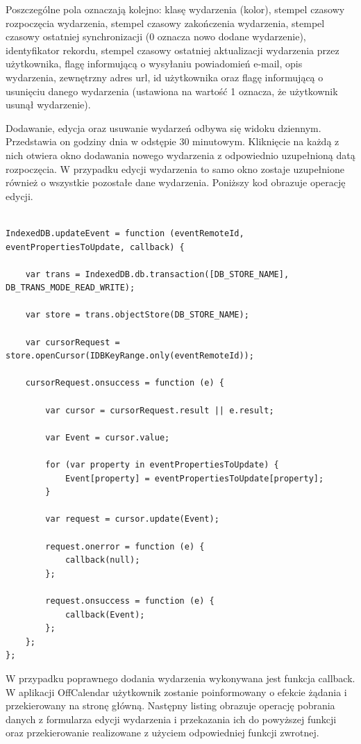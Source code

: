Poszczególne pola oznaczają kolejno: klasę wydarzenia (kolor), stempel czasowy rozpoczęcia wydarzenia, stempel czasowy zakończenia wydarzenia, stempel czasowy ostatniej synchronizacji (0 oznacza nowo dodane wydarzenie), identyfikator rekordu, stempel czasowy ostatniej aktualizacji wydarzenia przez użytkownika, flagę informującą o wysyłaniu powiadomień \mbox{e-mail}, opis wydarzenia, zewnętrzny adres url, id użytkownika oraz flagę informującą o usunięciu danego wydarzenia (ustawiona na wartość 1 oznacza, że użytkownik usunął wydarzenie).

Dodawanie, edycja oraz usuwanie wydarzeń odbywa się widoku dziennym. Przedstawia on godziny dnia w odstępie 30 minutowym. Kliknięcie na każdą z nich otwiera okno dodawania nowego wydarzenia z odpowiednio uzupełnioną datą rozpoczęcia. W przypadku edycji wydarzenia to samo okno zostaje uzupełnione również o wszystkie pozostałe dane wydarzenia. Poniższy kod obrazuje operację edycji.

\begin{lstlisting}[caption=Edycja wydarzenia cz. 1., label=amb, captionpos=b]

IndexedDB.updateEvent = function (eventRemoteId, eventPropertiesToUpdate, callback) {

    var trans = IndexedDB.db.transaction([DB_STORE_NAME], DB_TRANS_MODE_READ_WRITE);

    var store = trans.objectStore(DB_STORE_NAME);

    var cursorRequest = store.openCursor(IDBKeyRange.only(eventRemoteId));

    cursorRequest.onsuccess = function (e) {

        var cursor = cursorRequest.result || e.result;

        var Event = cursor.value;

        for (var property in eventPropertiesToUpdate) {
            Event[property] = eventPropertiesToUpdate[property];
        }

        var request = cursor.update(Event);

        request.onerror = function (e) {
            callback(null);
        };

        request.onsuccess = function (e) {
            callback(Event);
        };
    };
};

\end{lstlisting}

W przypadku poprawnego dodania wydarzenia wykonywana jest funkcja callback. W aplikacji \mbox{OffCalendar} użytkownik zostanie poinformowany o efekcie żądania i przekierowany na stronę główną. Następny listing obrazuje operację pobrania danych z formularza edycji wydarzenia i przekazania ich do powyższej funkcji oraz przekierowanie realizowane z użyciem odpowiedniej funkcji zwrotnej.

